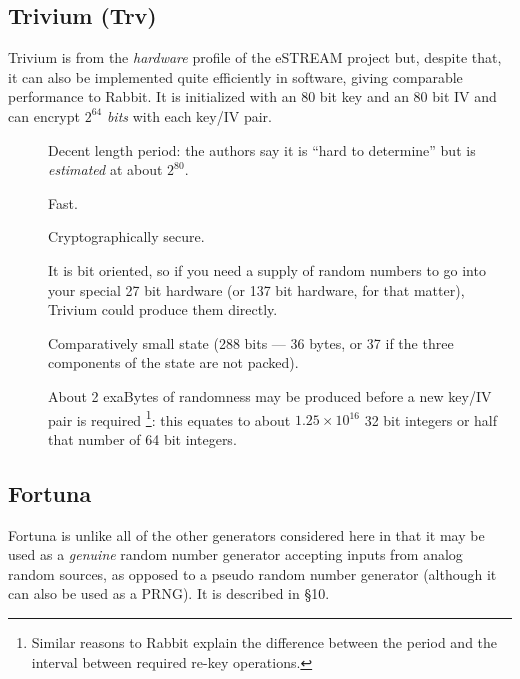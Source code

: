 \documentclass[letterpaper,12pt]{article}
\begin{document}
\subsection{Trivium (Trv)}
Trivium is from the {\em hardware} profile of the eSTREAM
project\cite{eStream} but, despite that, it can also be implemented quite
efficiently in software, giving comparable performance%
\cite{Bernstein:cypherSpeed} to Rabbit. It is initialized with an 80 bit
key and an 80 bit IV and can encrypt $2^{64}$ {\em bits} with each key/IV
pair.
\begin{description}
\item[\GoodThing]
  Decent length period: the authors say it is ``hard to determine'' but is
  {\em estimated} at about $2^{80}$.
\item[\GoodThing]
  Fast.
\item[\PossiblyGoodThing]
  Cryptographically secure.
\item[\PossiblyGoodThing]
  It is bit oriented, so if you need a supply of random numbers to go into
  your special 27 bit hardware (or 137 bit hardware, for that matter),
  Trivium could produce them directly.
\item[\GoodThing]
  Comparatively small state (288 bits --- 36 bytes, or 37 if the three
  components of the state are not packed).
\item[\PossiblyBadThing]
  About 2 exaBytes of randomness may be produced before a new key/IV
  pair is required%
  \footnote{
    Similar reasons to Rabbit explain the difference between the
    period and the interval between required re-key operations.
  }:
  this equates to about $1.25 \times 10^{16}$ 32 bit integers or half that
  number of 64 bit integers.
\end{description}

\subsection{Fortuna}
Fortuna is unlike all of the other generators considered here in that it
may be used as a {\em genuine} random number generator accepting inputs
from analog random sources, as opposed to a pseudo random number generator
(although it can also be used as a PRNG). It is described in
\cite{Schneier:PracticalCryptography} \S 10.
\end{document}
